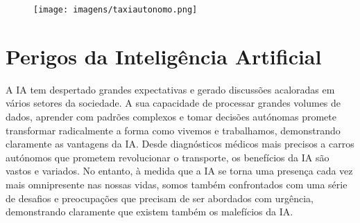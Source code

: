 \documentclass{report}
\begin{document}
\begin{figure}[ht]
        \centering
        \texttt{[image: imagens/taxiautonomo.png]}
        \caption{}
        \label{fig:Carro}
    \end{figure}
\vspace{5pt}


\chapter{Perigos da Inteligência Artificial}
\label{chap.perigos}

A \ac{IA} tem despertado grandes expectativas e gerado discussões acaloradas em vários setores da sociedade. A sua capacidade de processar grandes volumes de dados, aprender com padrões complexos e tomar decisões autónomas promete transformar radicalmente a forma como vivemos e trabalhamos, demonstrando claramente as vantagens da \ac{IA}. Desde diagnósticos médicos mais precisos a carros autónomos que prometem revolucionar o transporte, os benefícios da \ac{IA} são vastos e variados.
No entanto, à medida que a \ac{IA} se torna uma presença cada vez mais omnipresente nas nossas vidas, somos também confrontados com uma série de desafios e preocupações que precisam de ser abordados com urgência, demonstrando claramente que existem também os malefícios da \ac{IA}. 
\vspace{10pt}
\end{document}
